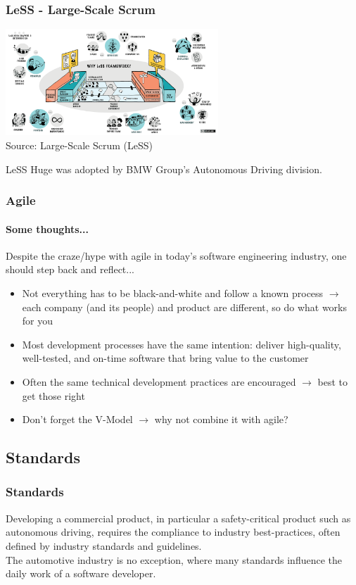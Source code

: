 \begin{frame}
\frametitle{LeSS - Large-Scale Scrum}
\begin{center}
\includegraphics[width=0.6\textwidth]{images/agile-less.png}\\
\footnotesize Source: Large-Scale Scrum (LeSS)\footnotemark[1]\\
\end{center}
LeSS Huge was adopted by BMW Group's Autonomous Driving division.\footnotemark[2] 
\end{frame}

\begin{frame}
\frametitle{Agile}
\framesubtitle{Some thoughts...}
Despite the craze/hype with agile in today's software engineering industry, one
should step back and reflect...\\
\begin{itemize}
    \item Not everything has to be black-and-white and follow a known process
        $\rightarrow$ each company (and its people) and product are different,
        so do what works for you
    \item Most development processes have the same intention: deliver
        high-quality, well-tested, and on-time software that bring value to the
        customer
    \item Often the same technical development practices are encouraged
        $\rightarrow$ best to get those right
    \item Don't forget the V-Model $\rightarrow$ why not combine it with agile?
\end{itemize}
\end{frame}

\subsection{Standards}

\begin{frame}
\frametitle{Standards}
Developing a commercial product, in particular a safety-critical product such
as autonomous driving, requires the compliance to industry best-practices,
often defined by industry standards and guidelines.\\

The automotive industry is no exception, where many standards influence the
daily work of a software developer.
\end{frame}

